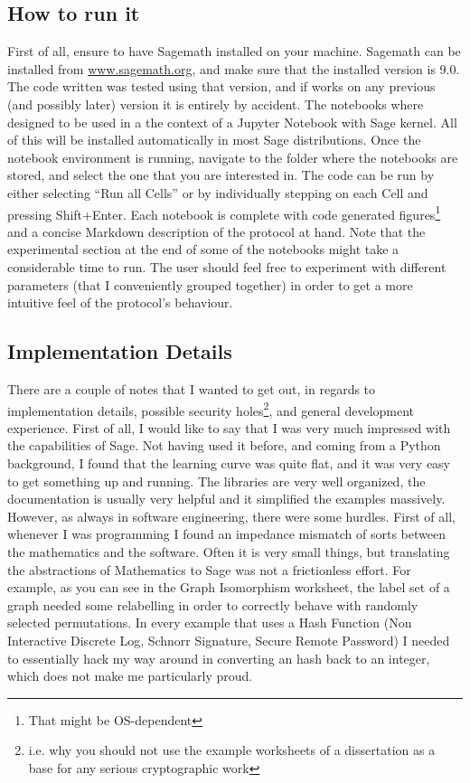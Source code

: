 \documentclass{article}
\begin{document}
\subsection{How to run it}
First of all, ensure to have Sagemath installed on your machine.
Sagemath can be installed from \url{www.sagemath.org}, and make sure that the installed version is 9.0.
The code written was tested using that version, and if works on any previous (and possibly later) version it is entirely
by accident. The notebooks where designed to be used in a the context of a Jupyter Notebook with Sage kernel. All of this
will be installed automatically in most Sage distributions. Once the notebook environment is running, navigate to the
folder where the notebooks are stored, and select the one that you are interested in. The code can be run by either
selecting \enquote{Run all Cells} or by individually stepping on each Cell and pressing Shift+Enter. Each notebook is complete
with code generated figures\footnote{That might be OS-dependent} and a concise Markdown description of the protocol at hand.
Note that the experimental section at the end of some of the notebooks might take a considerable time to run.
The user should feel free to experiment with different parameters (that I conveniently grouped together) in order to
get a more intuitive feel of the protocol's behaviour.

\subsection{Implementation Details}
There are a couple of notes that I wanted to get out, in regards to implementation details, possible security holes\footnote{i.e. why you should not use the example worksheets of a dissertation as a base for any serious cryptographic
    work}, and general development experience. First of all, I would like to say that I was very much impressed with
the capabilities of Sage. Not having used it before, and coming from a Python background, I found that the learning
curve was quite flat, and it was very easy to get something up and running. The libraries are very well organized,
the documentation is usually very helpful and it simplified the examples massively. However, as always in software
engineering, there were some hurdles. First of all, whenever I was programming I found an impedance mismatch of
sorts between the mathematics and the software. Often it is very small things, but translating the abstractions of
Mathematics to Sage was not a frictionless effort. For example, as you can see in the Graph Isomorphism worksheet,
the label set of a graph needed some relabelling in order to correctly behave with randomly selected permutations.
In every example that uses a Hash Function (Non Interactive Discrete Log, Schnorr Signature, Secure Remote Password)
I needed to essentially hack my way around in converting an hash back to an integer,
which does not make me particularly proud.
\end{document}
